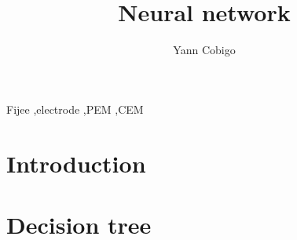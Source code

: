 \documentclass[final, paper=letter,5p,times,twocolumn]{elsarticle}
\begin{document}
\begin{frontmatter}

\title{Neural network}

\author[label1]{Yann Cobigo}
\address[label1]{University of California, San Francisco | ucsf.edu}




\begin{abstract}
 \lipsum[11-15]
\end{abstract}

\begin{keyword}
Fijee \sep electrode \sep PEM \sep CEM
\end{keyword}

\end{frontmatter}


\section{Introduction}

\lipsum[100-104]


\section{Decision tree}
\end{document}
